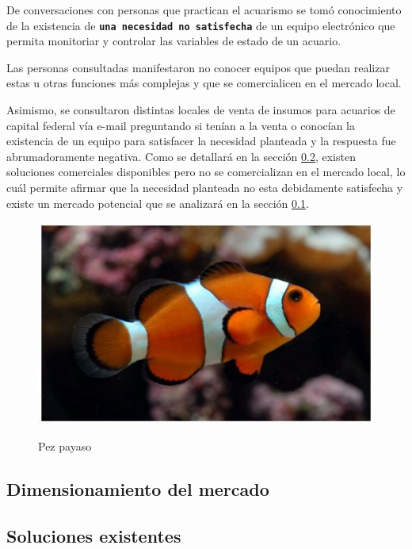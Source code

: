De conversaciones con personas que practican el acuarismo se tomó conocimiento de la existencia de \textbf{\texttt{una necesidad no satisfecha}} de un equipo electrónico que permita monitoriar y controlar las variables de estado de un acuario. 
 
Las personas consultadas manifestaron no conocer equipos que puedan realizar estas u otras funciones más complejas y que se comercialicen en el mercado local.  

Asimismo, se consultaron distintas locales de venta de insumos para acuarios de capital federal vía e-mail preguntando si tenían a la venta o conocían la existencia de un equipo para satisfacer la necesidad planteada y la respuesta fue abrumadoramente negativa. Como se detallará en la sección \ref{sec:existentes}, existen soluciones comerciales disponibles pero no se comercializan en el mercado local, lo cuál permite afirmar que la necesidad planteada no esta debidamente satisfecha y existe un mercado potencial que se analizará en la sección \ref{sec:mercado}.

\begin{figure}[h!]
	\centering
    \includegraphics[width=.9\textwidth]{./Figures/nemo.jpg}
	\label{fig:nemo}
	\caption{Pez payaso}
\end{figure}

\subsection{Dimensionamiento del mercado}
\label{sec:mercado}

\subsection{Soluciones existentes}
\label{sec:existentes}

